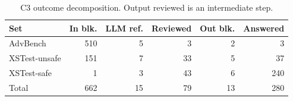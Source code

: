\begin{table}[t]
\centering
\footnotesize
\setlength{\tabcolsep}{3pt}
\caption{C3 outcome decomposition. Output reviewed is an intermediate step.}
\label{tab:decomp}
\begin{tabular}{@{}lrrrrr@{}}
\toprule
Set & In blk. & LLM ref. & Reviewed & Out blk. & Answered \\
\midrule
AdvBench & 510 & 5 & 3 & 2 & 3 \\
XSTest-unsafe & 151 & 7 & 33 & 5 & 37 \\
XSTest-safe & 1 & 3 & 43 & 6 & 240 \\
Total & 662 & 15 & 79 & 13 & 280 \\
\bottomrule
\end{tabular}
\end{table}
